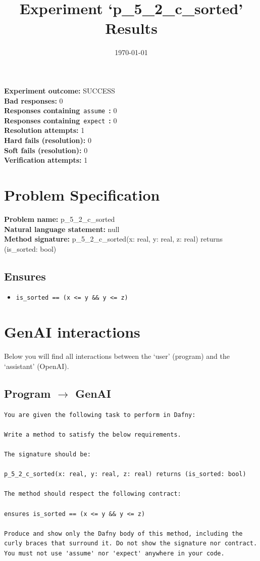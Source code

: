 \documentclass{article}
\begin{document}
\title{Experiment `p\_5\_2\_c\_sorted' Results}
\author{\today}
\date{}
\maketitle
\textbf{Experiment outcome: }SUCCESS
\\\textbf{Bad responses: }0
\\\textbf{Responses containing}~\texttt{assume}~\textbf{: }0
\\\textbf{Responses containing}~\texttt{expect}~\textbf{: }0
\\\textbf{Resolution attempts: }1
\\\textbf{Hard fails (resolution): }0
\\\textbf{Soft fails (resolution): }0
\\\textbf{Verification attempts: }1
\section*{Problem Specification}
\textbf{Problem name: }p\_5\_2\_c\_sorted
\\\textbf{Natural language statement: }null
\\\textbf{Method signature: }p\_5\_2\_c\_sorted(x: real, y: real, z: real) returns (is\_sorted: bool)
\subsection*{Ensures}
\begin{itemize}
\item \texttt{is\_sorted == (x <= y \&\& y <= z)}
\end{itemize}
\clearpage
\section*{GenAI interactions}
Below you will find all interactions between the `user' (program) and the `assistant' (OpenAI).
\subsection*{Program $\rightarrow$ GenAI}
\begin{lstlisting}
You are given the following task to perform in Dafny:

Write a method to satisfy the below requirements.

The signature should be:

p_5_2_c_sorted(x: real, y: real, z: real) returns (is_sorted: bool)

The method should respect the following contract:

ensures is_sorted == (x <= y && y <= z)

Produce and show only the Dafny body of this method, including the curly braces that surround it. Do not show the signature nor contract. You must not use 'assume' nor 'expect' anywhere in your code.
\end{lstlisting}
\end{document}
